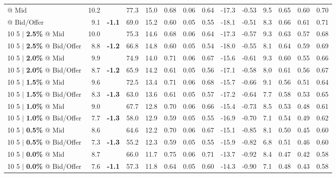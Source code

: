 \documentclass{beamer}
\begin{document}
\begin{frame}
\begin{table}
{\begin{tabular}{lrcrrrrrrrrrrr}
\addlinespace
\color{blue}{10 5 $|$ \bf 3.0\%} @ Mid & 10.2 & & 77.3 & 15.0 & 0.68 & 0.06 & 0.64 & -17.3 & -0.53 & 9.5 & 0.65 & 0.60 & 0.70\\
\color{blue}{10 5 $|$ \bf 3.0\%} @ Bid/Offer & 9.1 & {\bf \color{red}-1.1} & 69.0 & 15.2 & 0.60 & 0.05 & 0.55 & -18.1 & -0.51 & 8.3 & 0.66 & 0.61 & 0.71\\
\addlinespace
{10 5 $|$ \bf 2.5\%} @ Mid & 10.0 & & 75.3 & 14.6 & 0.68 & 0.06 & 0.64 & -17.3 & -0.57 & 9.3 & 0.63 & 0.57 & 0.68\\
{10 5 $|$ \bf 2.5\%} @ Bid/Offer & 8.8 & {\bf \color{red}-1.2} & 66.8 & 14.8 & 0.60 & 0.05 & 0.54 & -18.0 & -0.55 & 8.1 & 0.64 & 0.59 & 0.69\\
\addlinespace
{10 5 $|$ \bf 2.0\%} @ Mid & 9.9 & & 74.9 & 14.0 & 0.71 & 0.06 & 0.67 & -15.6 & -0.61 & 9.3 & 0.60 & 0.55 & 0.66\\
{10 5 $|$ \bf 2.0\%} @ Bid/Offer & 8.7 & {\bf \color{red}-1.2} & 65.9 & 14.2 & 0.61 & 0.05 & 0.56 & -17.1 & -0.58 & 8.0 & 0.61 & 0.56 & 0.67\\
\addlinespace
{10 5 $|$ \bf 1.5\%} @ Mid & 9.6 & & 72.5 & 13.4 & 0.71 & 0.06 & 0.68 & -15.7 & -0.66 & 9.1 & 0.56 & 0.51 & 0.64\\
{10 5 $|$ \bf 1.5\%} @ Bid/Offer & 8.3 & {\bf \color{red}-1.3} & 63.0 & 13.6 & 0.61 & 0.05 & 0.57 & -17.2 & -0.64 & 7.7 & 0.58 & 0.53 & 0.65\\
\addlinespace
{10 5 $|$ \bf 1.0\%} @ Mid & 9.0 & & 67.7 & 12.8 & 0.70 & 0.06 & 0.66 & -15.4 & -0.73 & 8.5 & 0.53 & 0.48 & 0.61\\
{10 5 $|$ \bf 1.0\%} @ Bid/Offer & 7.7 & {\bf \color{red}-1.3} & 58.0 & 12.9 & 0.59 & 0.05 & 0.55 & -16.9 & -0.70 & 7.1 & 0.54 & 0.49 & 0.62\\
\addlinespace
{10 5 $|$ \bf 0.5\%} @ Mid & 8.6 & & 64.6 & 12.2 & 0.70 & 0.06 & 0.67 & -15.1 & -0.85 & 8.1 & 0.50 & 0.45 & 0.60\\
{10 5 $|$ \bf 0.5\%} @ Bid/Offer & 7.3 & {\bf \color{red}-1.3} & 55.2 & 12.3 & 0.59 & 0.05 & 0.55 & -15.9 & -0.82 & 6.8 & 0.51 & 0.46 & 0.60\\
\addlinespace
{10 5 $|$ \bf 0.0\%} @ Mid & 8.7 & & 66.0 & 11.7 & 0.75 & 0.06 & 0.71 & -13.7 & -0.92 & 8.4 & 0.47 & 0.42 & 0.58\\
{10 5 $|$ \bf 0.0\%} @ Bid/Offer & 7.6 & {\bf \color{red}-1.1} & 57.3 & 11.8 & 0.64 & 0.05 & 0.60 & -14.3 & -0.90 & 7.1 & 0.48 & 0.43 & 0.58\\
\bottomrule
\end{tabular}
}
\end{table}
\end{frame}
\end{document}
